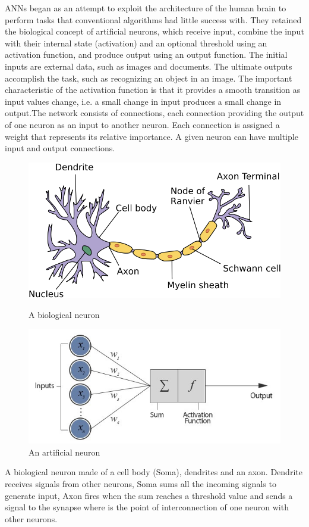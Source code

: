 \documentclass[10pt]{SelfArx} %
\begin{document}
ANNs began as an attempt to exploit the architecture of the human brain to perform tasks that conventional algorithms had little success with. They retained the biological concept of artificial neurons, which receive input, combine the input with their internal state (activation) and an optional threshold using an activation function, and produce output using an output function. The initial inputs are external data, such as images and documents. The ultimate outputs accomplish the task, such as recognizing an object in an image. The important characteristic of the activation function is that it provides a smooth transition as input values change, i.e. a small change in input produces a small change in output.The network consists of connections, each connection providing the output of one neuron as an input to another neuron. Each connection is assigned a weight that represents its relative importance. A given neuron can have multiple input and output connections.
\begin{figure}\centering
			\includegraphics[width=\linewidth]{img/neuron}
	\caption{A biological neuron}
		\includegraphics[width=\linewidth]{img/aneuron}
	\caption{An artificial neuron}	
\end{figure}
A biological neuron made of a cell body (Soma), dendrites and an axon. Dendrite receives signals from other neurons, Soma sums all the incoming signals to generate input, Axon fires when the sum reaches a threshold value and sends a signal to the synapse where is the point of interconnection of one neuron with other neurons.
\end{document}
